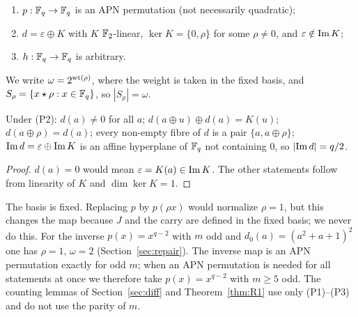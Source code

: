\begin{assumption}[PD]\label{ass:PD}
\begin{enumerate}
\item[(P1)] $p:\mathbb{F}_q\to\mathbb{F}_q$ is an APN permutation (not necessarily quadratic);
\item[(P2)] $d=\varepsilon\oplus K$ with $K$ $\mathbb{F}_2$-linear, $\ker K=\{0,\rho\}$ for some $\rho\ne0$, and $\varepsilon\notin\mathrm{Im}\, K$;
\item[(P3)] $h:\mathbb{F}_q\to\mathbb{F}_q$ is arbitrary.
\end{enumerate}
We write $\omega=2^{\mathrm{wt}(\rho)}$, where the weight is taken in the fixed basis, and
$S_\rho=\{x\star\rho:x\in\mathbb{F}_q\}$, so $|S_\rho|=\omega$.
\end{assumption}

\begin{lemma}\label{lem:d}
Under (P2): $d(a)\ne0$ for all $a$; $d(a\oplus u)\oplus d(a)=K(u)$; $d(a\oplus\rho)=d(a)$; every
non-empty fibre of $d$ is a pair $\{a,a\oplus\rho\}$; $\mathrm{Im}\, d=\varepsilon\oplus\mathrm{Im}\, K$ is an affine
hyperplane of $\mathbb{F}_q$ not containing $0$, so $|\mathrm{Im}\, d|=q/2$.
\end{lemma}
\begin{proof}
$d(a)=0$ would mean $\varepsilon=K(a)\in\mathrm{Im}\, K$. The other statements follow from linearity of $K$
and $\dim\ker K=1$.
\end{proof}

\begin{remark}
The basis is fixed. Replacing $p$ by $p(\rho x)$ would normalize $\rho=1$, but this changes the map
because $J$ and the carry are defined in the fixed basis; we never do this. For the inverse
$p(x)=x^{q-2}$ with $m$ odd and $d_0(a)=(a^2+a+1)^2$ one has $\rho=1$, $\omega=2$
(Section~\ref{sec:repair}). The inverse map is an APN permutation exactly for odd $m$; when an APN permutation
is needed for all statements at once we therefore take $p(x)=x^{q-2}$ with $m\ge5$ odd. The counting lemmas of
Section~\ref{sec:diff} and Theorem~\ref{thm:R1} use only (P1)--(P3) and do not use the parity of $m$.
\end{remark}

